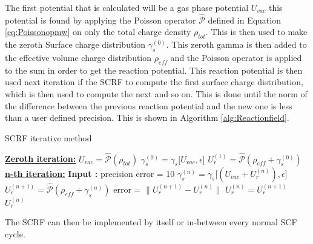 \documentclass[../master_thesis.tex]{subfiles}
\begin{document}
The first potential that is calculated will be a gas phase potential $U_{vac}$ this
potential is found by applying the Poisson operator $\hat{\mathscr{P}}$ defined
in Equation \ref{eq:Poissonopmw} on only the total charge density $\rho_{tot}$.
This is then used to make the zeroth Surface charge distribution $\gamma_s^{(0)}$.
This zeroth gamma is then added to the effective volume charge distribution $\rho_{eff}$
and the Poisson operator is applied to the sum in order to get the reaction potential.
This reaction potential is then used next iteration if the \ac{SCRF} to compute
the first surface charge distribution, which is then used to compute the next
and so on. This is done until the norm of the difference between the previous
reaction potential and the new one is less than a user defined precision. This is shown in
Algorithm \ref{alg:Reactionfield}.
\begin{algorithm}
  \caption{\ac{SCRF} iterative method}\label{alg:Reactionfield}
  \begin{algorithmic}
    \STATE \underline{\textbf{Zeroth iteration:}}
    \STATE $U_{vac} = \hat{\mathscr{P}}(\rho_{tot})$
    \STATE $\gamma_s^{(0)} = \gamma_s\big[U_{vac}, \epsilon\big]$
    \STATE $U_r^{(1)} = \hat{\mathscr{P}}(\rho_{eff} + \gamma_s^{(0)})$
    \STATE \underline{\textbf{n-th iteration:}}
    \STATE \textbf{Input :} precision
    \STATE error = 10
      \STATE $\gamma_s^{(n)} = \gamma_s\big[(U_{vac}+ U_r^{(n)}), \epsilon\big]$
      \STATE $U_r^{(n+1)} = \hat{\mathscr{P}} (\rho_{eff} + \gamma_s^{(n)})$
      \STATE error = $\lVert U_r^{(n+1)} - U_r^{(n)} \rVert$
      \STATE $U_r^{(n)} = U_r^{(n+1)}$
    \ENDWHILE
    \RETURN $U_r^{(n)}$
  \end{algorithmic}
\end{algorithm}
The \ac{SCRF} can then be implemented by itself or in-between every normal
\ac{SCF} cycle.
\end{document}
